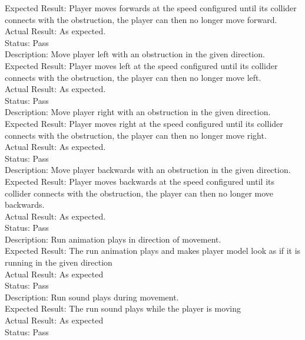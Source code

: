\documentclass[11pt,a4paper]{article}
\begin{document}
Expected Result: Player moves forwards at the speed configured until its collider connects with the obstruction, the player can then no longer move forward.\\
Actual Result: As expected.\\
Status: Pass
\smallskip\\
Description: Move player left with an obstruction in the given direction.\\
Expected Result: Player moves left at the speed configured until its collider connects with the obstruction, the player can then no longer move left.\\
Actual Result: As expected.\\
Status: Pass
\smallskip\\
Description: Move player right with an obstruction in the given direction.\\
Expected Result: Player moves right at the speed configured until its collider connects with the obstruction, the player can then no longer move right.\\
Actual Result: As expected.\\
Status: Pass
\smallskip\\
Description: Move player backwards with an obstruction in the given direction.\\
Expected Result: Player moves backwards at the speed configured until its collider connects with the obstruction, the player can then no longer move backwards.\\
Actual Result: As expected.\\
Status: Pass
\smallskip\\
Description: Run animation plays in direction of movement.\\
Expected Result: The run animation plays and makes player model look as if it is running in the given direction\\
Actual Result: As expected\\
Status: Pass
\smallskip\\
Description: Run sound plays during movement.\\
Expected Result: The run sound plays while the player is moving\\
Actual Result: As expected\\
Status: Pass
\end{document}
